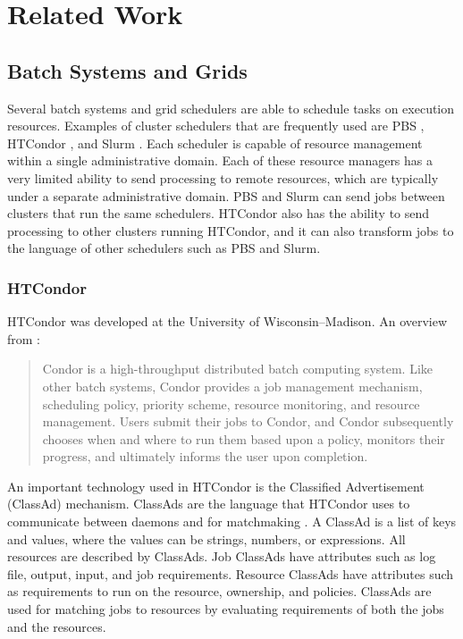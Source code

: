 \chapter{Related Work}
\label{chapter:relatedwork}

\section{Batch Systems and Grids}


Several batch systems and grid schedulers are able to schedule tasks on execution resources.  Examples of cluster schedulers that are frequently used are PBS \cite{pbstorque}, \mbox{HTCondor} \cite{litzkow1988condor}, and Slurm \cite{yoo2003slurm}.  Each scheduler is capable of resource management within a single administrative domain.  Each of these resource managers has a very limited ability to send processing to remote resources, which are typically under a separate administrative domain.  PBS and Slurm can send jobs between clusters that run the same schedulers.  HTCondor also has the ability to send processing to other clusters running HTCondor, and it can also transform jobs to the language of other schedulers such as PBS and Slurm.

\subsection{HTCondor}
HTCondor was developed at the University of Wisconsin--Madison.  An overview from \cite{thain2005distributed}:
\begin{quotation}
	Condor is a high-throughput distributed batch computing system.  Like other batch systems, Condor provides a job management mechanism, scheduling policy, priority scheme, resource monitoring, and resource management.  Users submit their jobs to Condor, and Condor subsequently chooses when and where to run them based upon a policy, monitors their progress, and ultimately informs the user upon completion.  
\end{quotation}

An important technology used in HTCondor is the Classified Advertisement (\mbox{ClassAd}) mechanism.  ClassAds are the language that HTCondor uses to communicate between daemons and for matchmaking \cite{raman1998matchmaking}.  A ClassAd is a list of keys and values, where the values can be strings, numbers, or expressions.  All resources are described by ClassAds.  Job ClassAds have attributes such as log file, output, input, and job requirements.  Resource ClassAds have attributes such as  requirements to run on the resource, ownership, and policies.  ClassAds are used for matching jobs to resources by evaluating requirements of both the jobs and the resources.


